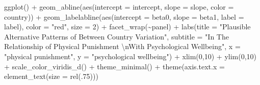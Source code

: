 \documentclass[
  letterpaper,
  DIV=11,
  numbers=noendperiod]{scrreprt}
\newenvironment{Shaded}{\begin{snugshade}}{\end{snugshade}}
\newcommand{\AttributeTok}[1]{\textcolor[rgb]{0.40,0.45,0.13}{#1}}
\newcommand{\DecValTok}[1]{\textcolor[rgb]{0.68,0.00,0.00}{#1}}
\newcommand{\FunctionTok}[1]{\textcolor[rgb]{0.28,0.35,0.67}{#1}}
\newcommand{\NormalTok}[1]{\textcolor[rgb]{0.00,0.23,0.31}{#1}}
\newcommand{\SpecialCharTok}[1]{\textcolor[rgb]{0.37,0.37,0.37}{#1}}
\newcommand{\StringTok}[1]{\textcolor[rgb]{0.13,0.47,0.30}{#1}}
\begin{document}
\begin{Shaded}
\begin{Highlighting}[]
  \FunctionTok{ggplot}\NormalTok{() }\SpecialCharTok{+}
  \FunctionTok{geom\_abline}\NormalTok{(}\FunctionTok{aes}\NormalTok{(}\AttributeTok{intercept =}\NormalTok{ intercept, }
                  \AttributeTok{slope =}\NormalTok{ slope,}
                  \AttributeTok{color =}\NormalTok{ country)) }\SpecialCharTok{+}
  \FunctionTok{geom\_labelabline}\NormalTok{(}\FunctionTok{aes}\NormalTok{(}\AttributeTok{intercept =}\NormalTok{ beta0,}
                      \AttributeTok{slope =}\NormalTok{ beta1,}
                      \AttributeTok{label =}\NormalTok{ label),}
                  \AttributeTok{color =} \StringTok{"red"}\NormalTok{,}
                  \AttributeTok{size =} \DecValTok{2}\NormalTok{) }\SpecialCharTok{+}
  \FunctionTok{facet\_wrap}\NormalTok{(}\SpecialCharTok{\textasciitilde{}}\NormalTok{panel) }\SpecialCharTok{+}
  \FunctionTok{labs}\NormalTok{(}\AttributeTok{title =} \StringTok{"Plausible Alternative Patterns of Between Country Variation"}\NormalTok{,}
       \AttributeTok{subtitle =} \StringTok{"In The Relationship of Physical Punishment }\SpecialCharTok{\textbackslash{}n}\StringTok{With Psychological Wellbeing"}\NormalTok{,}
       \AttributeTok{x =} \StringTok{"physical punishment"}\NormalTok{,}
       \AttributeTok{y =} \StringTok{"psychological wellbeing"}\NormalTok{) }\SpecialCharTok{+}
  \FunctionTok{xlim}\NormalTok{(}\DecValTok{0}\NormalTok{,}\DecValTok{10}\NormalTok{) }\SpecialCharTok{+}
  \FunctionTok{ylim}\NormalTok{(}\DecValTok{0}\NormalTok{,}\DecValTok{10}\NormalTok{) }\SpecialCharTok{+}
  \FunctionTok{scale\_color\_viridis\_d}\NormalTok{() }\SpecialCharTok{+}
  \FunctionTok{theme\_minimal}\NormalTok{() }\SpecialCharTok{+}
  \FunctionTok{theme}\NormalTok{(}\AttributeTok{axis.text.x =} \FunctionTok{element\_text}\NormalTok{(}\AttributeTok{size =} \FunctionTok{rel}\NormalTok{(.}\DecValTok{75}\NormalTok{)))}
\end{Highlighting}
\end{Shaded}
\end{document}
